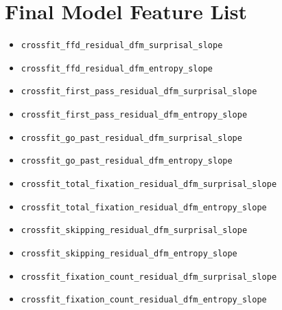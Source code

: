 \section{Final Model Feature List}
\begin{itemize}
\item \texttt{crossfit\_ffd\_residual\_dfm\_surprisal\_slope}
\item \texttt{crossfit\_ffd\_residual\_dfm\_entropy\_slope}
\item \texttt{crossfit\_first\_pass\_residual\_dfm\_surprisal\_slope}
\item \texttt{crossfit\_first\_pass\_residual\_dfm\_entropy\_slope}
\item \texttt{crossfit\_go\_past\_residual\_dfm\_surprisal\_slope}
\item \texttt{crossfit\_go\_past\_residual\_dfm\_entropy\_slope}
\item \texttt{crossfit\_total\_fixation\_residual\_dfm\_surprisal\_slope}
\item \texttt{crossfit\_total\_fixation\_residual\_dfm\_entropy\_slope}
\item \texttt{crossfit\_skipping\_residual\_dfm\_surprisal\_slope}
\item \texttt{crossfit\_skipping\_residual\_dfm\_entropy\_slope}
\item \texttt{crossfit\_fixation\_count\_residual\_dfm\_surprisal\_slope}
\item \texttt{crossfit\_fixation\_count\_residual\_dfm\_entropy\_slope}
\end{itemize}
